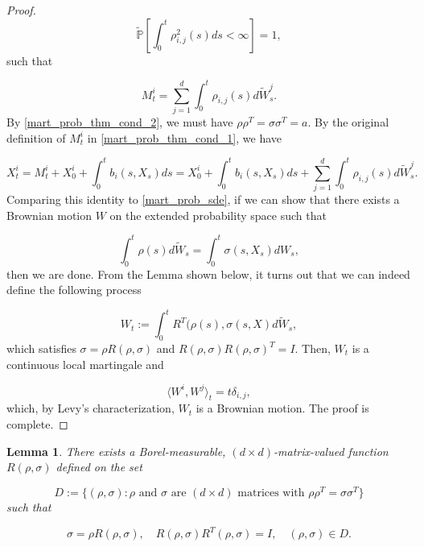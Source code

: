 \documentclass{article}
\newtheorem{lemma}{Lemma}
\begin{document}
\begin{proof}
\begin{equation*}
\tilde{\mathbb{P}}\left[\int^t_0 \rho_{i,j}^2(s)ds<\infty\right]=1,
\end{equation*}
such that 

\begin{equation*}
M_t^i=\sum^d_{j=1}\int^t_0\rho_{i,j}(s)d\tilde{W}_s^j.
\end{equation*}
By \eqref{mart_prob_thm_cond_2}, we must have $\rho\rho^T=\sigma\sigma^T=a$. By the original definition of $M^i_t$ in \eqref{mart_prob_thm_cond_1}, we have 

\begin{equation*}
X_t^i=M_t^i+X_0^i+\int^t_0b_i(s,X_s)ds=X_0^i+\int^t_0b_i(s,X_s)ds+\sum^d_{j=1}\int^t_0\rho_{i,j}(s)d\tilde{W}_s^j.
\end{equation*}
Comparing this identity to \eqref{mart_prob_sde}, if we can show that there exists a Brownian motion $W$ on the extended probability space such that

\begin{equation*}
\int^t_0\rho(s)d\tilde{W}_s=\int^t_0\sigma(s,X_s)dW_s,
\end{equation*}
then we are done. From the Lemma shown below, it turns out that we can indeed define the following process

\begin{equation*}
W_t:=\int^t_0R^T(\rho(s),\sigma(s,X)d\tilde{W}_s,
\end{equation*}
which satisfies $\sigma=\rho R(\rho,\sigma)$ and $R(\rho,\sigma)R(\rho,\sigma)^T=I$. Then, $W_t$ is a continuous local martingale and 

\begin{equation*}
\langle W^i,W^j\rangle_t=t\delta_{i,j},
\end{equation*}
which, by Levy's characterization, $W_t$ is a Brownian motion. The proof is complete. 
\end{proof}

\begin{lemma}
There exists a Borel-measurable, $(d\times d)$-matrix-valued function $R(\rho,\sigma)$ defined on the set 

\begin{equation*}
D:=\{(\rho,\sigma): \text{$\rho$ and $\sigma$ are $(d\times d)$ matrices with $\rho\rho^T=\sigma\sigma^T$}\}
\end{equation*}
such that 

\begin{equation*}
\sigma=\rho R(\rho,\sigma), \quad R(\rho,\sigma)R^T(\rho,\sigma)=I, \quad (\rho,\sigma)\in D. 
\end{equation*}
\end{lemma}
\end{document}
